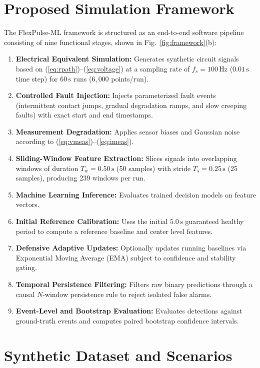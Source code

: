 \documentclass[conference]{IEEEtran}
\begin{document}
\section{Proposed Simulation Framework}
The FlexPulse-ML framework is structured as an end-to-end software pipeline consisting of nine functional stages, shown in Fig.~\ref{fig:framework}(b):
\begin{enumerate}
    \item \textbf{Electrical Equivalent Simulation:} Generates synthetic circuit signals based on (\ref{eq:rpath})--(\ref{eq:voltage}) at a sampling rate of $f_s = 100\,\text{Hz}$ ($0.01\,\text{s}$ time step) for $60\,\text{s}$ runs ($6,000$ points/run).
    \item \textbf{Controlled Fault Injection:} Injects parameterized fault events (intermittent contact jumps, gradual degradation ramps, and slow creeping faults) with exact start and end timestamps.
    \item \textbf{Measurement Degradation:} Applies sensor biases and Gaussian noise according to (\ref{eq:vmeas})--(\ref{eq:imeas}).
    \item \textbf{Sliding-Window Feature Extraction:} Slices signals into overlapping windows of duration $T_w = 0.50\,\text{s}$ (50 samples) with stride $T_s = 0.25\,\text{s}$ (25 samples), producing 239 windows per run.
    \item \textbf{Machine Learning Inference:} Evaluates trained decision models on feature vectors.
    \item \textbf{Initial Reference Calibration:} Uses the initial $5.0\,\text{s}$ guaranteed healthy period to compute a reference baseline and center level features.
    \item \textbf{Defensive Adaptive Updates:} Optionally updates running baselines via Exponential Moving Average (EMA) subject to confidence and stability gating.
    \item \textbf{Temporal Persistence Filtering:} Filters raw binary predictions through a causal $N$-window persistence rule to reject isolated false alarms.
    \item \textbf{Event-Level and Bootstrap Evaluation:} Evaluates detections against ground-truth events and computes paired bootstrap confidence intervals.
\end{enumerate}

\section{Synthetic Dataset and Scenarios}
\end{document}
